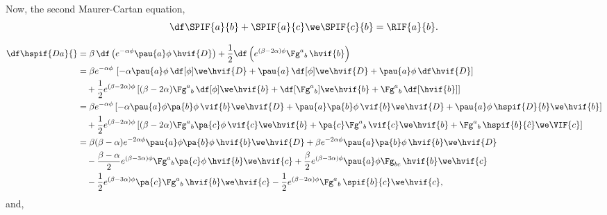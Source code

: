 Now, the second Maurer-Cartan equation,
\begin{equation}
  \df\SPIF{a}{b} + \SPIF{a}{c} \we \SPIF{c}{b} = \RIF{a}{b}.
\end{equation}

\begin{align}
  \df\hspif{D a}{} 
  &= \beta \, \df \left( e^{-\alpha \phi} \pau{a} \phi \,\hvif{D} \right) + \frac{1}{2} \df \left( e^{(\beta - 2\alpha) \phi} \Fg^a{}_{b} \, \hvif{b} \right) \nonumber\\
  &= \beta e^{-\alpha\phi} \, \left[ -\alpha \pau{a} \phi \, \df[\phi] \we \hvif{D} + \pau{a} \, \df[\phi] \we \hvif{D} + \pau{a} \phi \, \df \hvif{D} \right] \notag \\
  &\quad + \frac{1}{2} e^{(\beta - 2\alpha) \phi} \left[ (\beta-2\alpha) \Fg^a{}_{b} \, \df[\phi] \we \hvif{b} + \df[\Fg^a{}_{b}] \we \hvif{b} + \Fg^a{}_{b} \, \df[\hvif{b}] \right] \nonumber \\
  &= \beta e^{-\alpha\phi} \left[ -\alpha \pau{a} \phi \pa{b} \phi \, \vif{b} \we \hvif{D} + \pau{a} \pa{b} \phi \, \vif{b} \we \hvif{D} + \pau{a} \phi \, \hspif{D}{b} \we \hvif{b} \right] \notag \\
  &\quad + \frac{1}{2} e^{(\beta - 2\alpha) \phi} \left[ (\beta - 2\alpha) \Fg^a{}_b \pa{c} \phi \, \vif{c} \we \hvif{b} + \pa{c} \Fg^a{}_b \, \vif{c} \we \hvif{b} + \Fg^a{}_b \, \hspif{b}{\hat{c}} \we \VIF{c} \right] \nonumber \\
  &= \beta (\beta - \alpha) e^{-2\alpha \phi} \pau{a} \phi \pa{b} \phi \, \hvif{b} \we \hvif{D} + \beta e^{-2\alpha \phi} \pau{a} \pa{b} \phi \, \hvif{b} \we \hvif{D}  \notag \\
  &\quad - \frac{\beta-\alpha}{2} e^{(\beta - 3\alpha) \phi} \Fg^a{}_b \pa{c} \phi\, \hvif{b} \we \hvif{c} + \frac{\beta}{2} e^{(\beta - 3\alpha) \phi} \pau{a} \phi \Fg_{bc} \, \hvif{b} \we \hvif{c} \nonumber \\
  &\quad -\frac{1}{2} e^{(\beta - 3\alpha) \phi} \pa{c} \Fg^a{}_b \, \hvif{b} \we \hvif{c} - \frac{1}{2} e^{(\beta - 2\alpha) \phi} \Fg^a{}_b \, \spif{b}{c} \we \hvif{c},
\end{align}
and,
